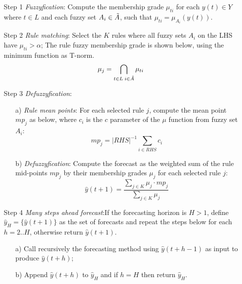 \begin{enumerate}
\item [Step 1] \textit{Fuzzyfication}: Compute the membership grade $\mu_{ti}$ for each $y(t) \in Y$ where $t \in L$ and each fuzzy set $A_i \in \Tilde{A}$, such that $\mu_{ti} = \mu_{A_i}(y(t))$. 
\item [Step 2] \textit{Rule matching}: Select the $K$ rules where all fuzzy sets $A_i$ on the LHS have $\mu_{ti} > \alpha$; The rule fuzzy membership grade is shown below, using the minimum function as T-norm.
\begin{equation}
    \mu_j = \bigcap_{t\in L\; i \in \Tilde{A}} \mu_{ti}
\end{equation}

\item [Step 3] \textit{Defuzzyfication}:
\begin{enumerate}
\item [a)] \textit{Rule mean points}: For each selected rule $j$, compute the mean point $mp_j$ as below, where $c_{i}$ is the $c$ parameter of the $\mu$ function from fuzzy set $A_i$:
\begin{equation}
mp_j = |RHS|^{-1}\sum_{i \in RHS} c_i
\end{equation}
\item [b)] \textit{Defuzzyfication}: Compute the forecast as the weighted sum of the rule mid-points $mp_j$ by their membership grades $\mu_j$ for each selected rule $j$:
\begin{equation}
\hat{y}(t+1) = \frac{\sum_{j \in K} \mu_j \cdot mp_j}{\sum_{j \in K} \mu_j}
\end{equation}
\end{enumerate}
\item[Step 4] \textit{Many steps ahead forecast}:If the forecasting horizon is $H > 1$, define $\hat{y}_H = \{\hat{y}(t+1)\}$ as the set of forecasts and repeat the steps below for each $h=2..H$, otherwise return  $\hat{y}(t+1)$.
\begin{enumerate}
    \item[a)]  Call recursively the forecasting method using $\hat{y}(t+h-1)$ as input to produce $\hat{y}(t+h)$;
    \item[b)] Append $\hat{y}(t+h)$ to $\hat{y}_H$ and if $h = H$ then return $\hat{y}_H$.
\end{enumerate}
\end{enumerate}



%

